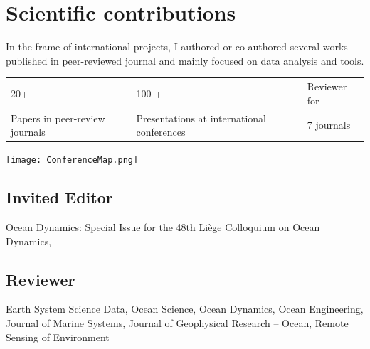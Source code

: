 \documentclass[11pt,a4paper,svgnames]{article}
\begin{document}
\section{Scientific contributions}

\begin{summarybox}
In the frame of international projects, I authored or co-authored several works published in peer-reviewed journal and mainly focused on data analysis and tools.
\end{summarybox}

\begin{table}[h]
\centering
\begin{tabular}{C{4cm}C{4cm}C{4cm}}
\huge{20+}  	& \huge{100 +} & 	Reviewer for\hspace{1cm}  \\
Papers in peer-review journals & Presentations at international conferences	& \huge{7} \hspace{2cm} \normalsize{journals} \\
\end{tabular}
\end{table}




 

\begin{center}
\texttt{[image: ConferenceMap.png]}
\end{center}

\subsection{Invited Editor}

Ocean Dynamics: Special Issue for the 48th Li\`{e}ge Colloquium on Ocean Dynamics, 

\subsection{Reviewer}

Earth System Science Data, Ocean Science, Ocean Dynamics, Ocean Engineering, Journal of Marine Systems, Journal of Geophysical Research -- Ocean, Remote Sensing of Environment
\end{document}
